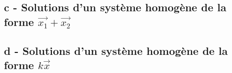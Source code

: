 \documentclass{config/homework}
\begin{document}
    \noindent{}
    \newpage


    \subsection{c - Solutions d'un système homogène de la forme $\vec{x_1} + \vec{x_2}$}\label{subsec:c}

    \newpage


    \subsection{d - Solutions d'un système homogène de la forme $k\vec{x}$}\label{subsec:d}

    \newpage
\end{document}
